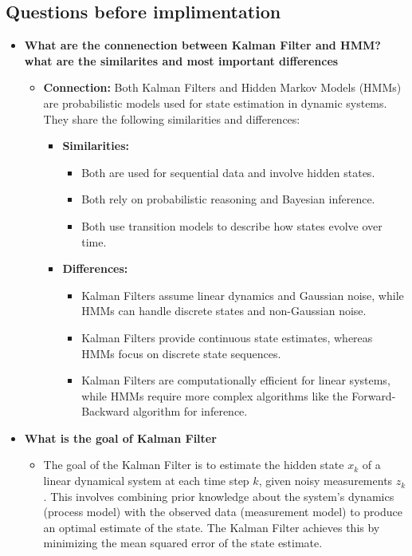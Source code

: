 \documentclass{article}
\begin{document}
\subsection*{Questions before implimentation}
\begin{itemize}
    \item \textbf{What are the connenection between Kalman Filter and HMM?what are the similarites and most important differences}
    \begin{itemize}
        \item \textbf{Connection:} Both Kalman Filters and Hidden Markov Models (HMMs) are probabilistic models used for state estimation in dynamic systems. They share the following similarities and differences:
            \begin{itemize}
                \item \textbf{Similarities:}
                \begin{itemize}
                    \item Both are used for sequential data and involve hidden states.
                    \item Both rely on probabilistic reasoning and Bayesian inference.
                    \item Both use transition models to describe how states evolve over time.
                \end{itemize}
                \item \textbf{Differences:}
                \begin{itemize}
                    \item Kalman Filters assume linear dynamics and Gaussian noise, while HMMs can handle discrete states and non-Gaussian noise.
                    \item Kalman Filters provide continuous state estimates, whereas HMMs focus on discrete state sequences.
                    \item Kalman Filters are computationally efficient for linear systems, while HMMs require more complex algorithms like the Forward-Backward algorithm for inference.
                \end{itemize}
            \end{itemize}
    \end{itemize}
    \item \textbf{What is the goal of Kalman Filter}
    \begin{itemize}
       \item  The goal of the Kalman Filter is to estimate the hidden state \(x_k\) of a linear dynamical system at each time step \(k\), given noisy measurements \(z_k\). 
        This involves combining prior knowledge about the system's dynamics (process model) with the observed data (measurement model) to produce an optimal estimate of the state.
         The Kalman Filter achieves this by minimizing the mean squared error of the state estimate.
    \end{itemize}
\end{itemize}
\end{document}

